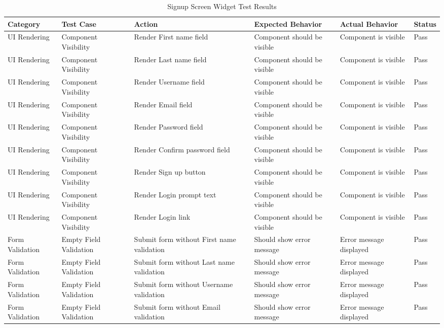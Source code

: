 \begin{table*}[t]
\centering
\caption{Signup Screen Widget Test Results}
\label{tab:signup_screen_widget}
\begin{tabular}{|p{2.5cm}|p{2.5cm}|p{3cm}|p{3cm}|p{3cm}|p{1cm}|}
\hline
\textbf{Category} & \textbf{Test Case} & \textbf{Action} & \textbf{Expected Behavior} & \textbf{Actual Behavior} & \textbf{Status} \\ \hline
UI Rendering & Component Visibility & Render First name field & Component should be visible & Component is visible & Pass \\ \hline
UI Rendering & Component Visibility & Render Last name field & Component should be visible & Component is visible & Pass \\ \hline
UI Rendering & Component Visibility & Render Username field & Component should be visible & Component is visible & Pass \\ \hline
UI Rendering & Component Visibility & Render Email field & Component should be visible & Component is visible & Pass \\ \hline
UI Rendering & Component Visibility & Render Password field & Component should be visible & Component is visible & Pass \\ \hline
UI Rendering & Component Visibility & Render Confirm password field & Component should be visible & Component is visible & Pass \\ \hline
UI Rendering & Component Visibility & Render Sign up button & Component should be visible & Component is visible & Pass \\ \hline
UI Rendering & Component Visibility & Render Login prompt text & Component should be visible & Component is visible & Pass \\ \hline
UI Rendering & Component Visibility & Render Login link & Component should be visible & Component is visible & Pass \\ \hline
Form Validation & Empty Field Validation & Submit form without First name validation & Should show error message & Error message displayed & Pass \\ \hline
Form Validation & Empty Field Validation & Submit form without Last name validation & Should show error message & Error message displayed & Pass \\ \hline
Form Validation & Empty Field Validation & Submit form without Username validation & Should show error message & Error message displayed & Pass \\ \hline
Form Validation & Empty Field Validation & Submit form without Email validation & Should show error message & Error message displayed & Pass \\ \hline

\end{tabular}
\end{table*}
